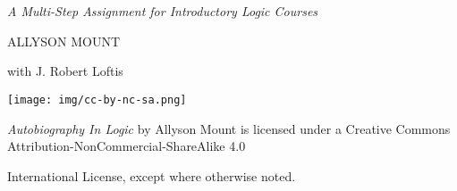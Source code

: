 \documentclass[oneside, openany]{book} %
\begin{document}
\setlength{\parindent}{1em}
\setlength{\parskip}{1em}	

\titlepage
\vfill

\\ \vspace{6pt}\\
\noindent\textit{A Multi-Step Assignment for Introductory Logic Courses}

\vfill
\noindent ALLYSON MOUNT 

\noindent with J. Robert Loftis
\vfill

\frontmatter


\noindent \texttt{[image: img/cc-by-nc-sa.png]}\\ \vspace{6pt}

\noindent \textit{Autobiography In Logic} by Allyson Mount is licensed under a Creative Commons Attribution-NonCommercial-ShareAlike 4.0 \\ \vspace{6pt}

\noindent International License, except where otherwise noted.



\tableofcontents
\end{document}
